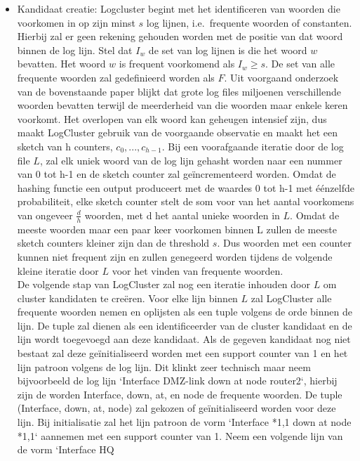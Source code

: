 \begin{itemize}
    \item Kandidaat creatie: 
    \subitem Logcluster begint met het identificeren van woorden die voorkomen in op zijn minst $s$ log lijnen, i.e.\ frequente woorden of constanten. Hierbij zal er geen rekening gehouden worden met de positie van dat woord binnen de log lijn. Stel dat \(I_{w}\) de set van log lijnen is die het woord $w$ bevatten. Het woord $w$ is frequent voorkomend als \(I_{w} \geq s\). De set van alle frequente woorden zal gedefinieerd worden als $F$. Uit voorgaand onderzoek van de bovenstaande paper blijkt dat grote log files miljoenen verschillende woorden bevatten terwijl de meerderheid van die woorden maar enkele keren voorkomt. Het overlopen van elk woord kan geheugen intensief zijn, dus maakt LogCluster gebruik van de voorgaande observatie en maakt het een sketch van h counters, \(c_{0}, ..., c_{h - 1}\). Bij een voorafgaande iteratie door de log file $L$, zal elk uniek woord van de log lijn gehasht worden naar een nummer van 0 tot h-1 en de sketch counter zal geïncrementeerd worden. Omdat de hashing functie een output produceert met de waardes 0 tot h-1 met éénzelfde probabiliteit, elke sketch counter stelt de som voor van het aantal voorkomens van ongeveer $\frac{d}{h}$ woorden, met d het aantal unieke woorden in $L$. Omdat de meeste woorden maar een paar keer voorkomen binnen L zullen de meeste sketch counters kleiner zijn dan de threshold $s$. Dus woorden met een counter kunnen niet frequent zijn en zullen genegeerd worden tijdens de volgende kleine iteratie door $L$ voor het vinden van frequente woorden.\\
    \subitem De volgende stap van LogCluster zal nog een iteratie inhouden door $L$ om cluster kandidaten te creëren. Voor elke lijn binnen $L$ zal LogCluster alle frequente woorden nemen en oplijsten als een tuple volgens de orde binnen de lijn. De tuple zal dienen als een identificeerder van de cluster kandidaat en de lijn wordt toegevoegd aan deze kandidaat. Als de gegeven kandidaat nog niet bestaat zal deze geïnitialiseerd worden met een support counter van 1 en het lijn patroon volgens de log lijn. Dit klinkt zeer technisch maar neem bijvoorbeeld de log lijn `Interface DMZ-link
    down at node router2`, hierbij zijn de worden Interface, down, at, en node de frequente woorden. De tuple (Interface, down, at, node) zal gekozen of geïnitialiseerd worden voor deze lijn. Bij initialisatie zal het lijn patroon de vorm `Interface *{1,1} down at node *{1,1}` aannemen met een support counter van 1. Neem een volgende lijn van de vorm `Interface HQ

\end{itemize}
